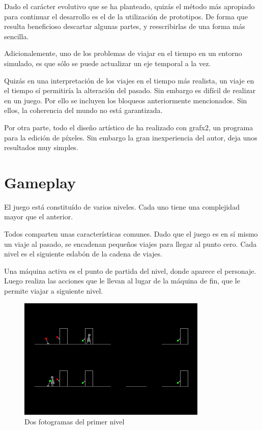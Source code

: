 \documentclass[11pt,a4paper]{article}
\begin{document}
Dado el carácter evolutivo que se ha planteado, quizás el método más apropiado 
para continuar el desarrollo es el de la utilización de prototipos. De forma que 
resulta beneficioso descartar algunas partes, y reescribirlas de una forma más 
sencilla.

Adicionalemente, uno de los problemas de viajar en el tiempo en un entorno 
simulado, es que sólo se puede actualizar un eje temporal a la vez.

Quizás en una interpretación de los viajes en el tiempo más realista, un viaje 
en el tiempo sí permitiría la alteración del pasado. Sin embargo es difícil de 
realizar en un juego. Por ello se incluyen los bloqueos anteriormente 
mencionados. Sin ellos, la coherencia del mundo no está garantizada.

Por otra parte, todo el diseño artístico de ha realizado con grafx2, un programa 
para la edición de píxeles. Sin embargo la gran inexperiencia del autor, deja 
unos resultados muy simples.

\section{Gameplay}

El juego está constituído de varios niveles. Cada uno tiene una complejidad 
mayor que el anterior.

Todos comparten unas características comunes. Dado que el juego es en sí mismo 
un viaje al pasado, se encadenan pequeños viajes para llegar al punto cero. Cada 
nivel es el siguiente eslabón de la cadena de viajes.

Una máquina activa es el punto de partida del nivel, donde aparece el personaje. 
Luego realiza las acciones que le llevan al lugar de la máquina de fin, que le 
permite viajar a siguiente nivel.

\begin{figure}[h]
\centering
\includegraphics[scale=0.8]{level1.png}
\caption{Dos fotogramas del primer nivel}
\label{fig:level1}
\end{figure}
\end{document}

